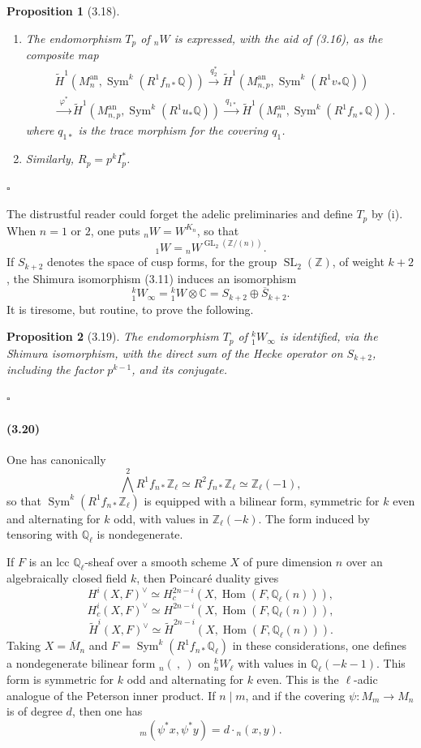 \documentclass[10pt]{article}
\newcommand{\C}{\mathbb C}
\newcommand{\Q}{\mathbb Q}
\newcommand{\Z}{\mathbb Z}
\newcommand{\GL}{\operatorname{GL}}
\newcommand{\SL}{\operatorname{SL}}
\newcommand{\Hom}{\operatorname{Hom}}
\newcommand{\Sym}{\operatorname{Sym}}
\newcommand{\an}{\mathrm{an}}
\newcommand{\QED}{\hfill$\square$}
\newtheorem*{proposition}{Proposition}
\begin{document}
\begin{proposition}[3.18]
\leavevmode
\begin{enumerate}[label=(\roman*)]
\item The endomorphism $T_p$ of ${}_nW$ is expressed, with the aid of (3.16), as the composite map
\[
\begin{aligned}
&\widetilde H^1(M_n^{\an},\Sym^k(R^1f_{n*}\Q))
\xrightarrow{\ q_2^*\ }
\widetilde H^1(M_{n,p}^{\an},\Sym^k(R^1v_*\Q))\\
&\xrightarrow{\ \varphi^*\ }
\widetilde H^1(M_{n,p}^{\an},\Sym^k(R^1u_*\Q))
\xrightarrow{\ q_{1*}\ }
\widetilde H^1(M_n^{\an},\Sym^k(R^1f_{n*}\Q)).
\end{aligned}
\]
where $q_{1*}$ is the trace morphism for the covering $q_1$.
\item Similarly, $R_p=p^k I_p^*$.
\end{enumerate}
\end{proposition}
\QED

The distrustful reader could forget the adelic preliminaries and define $T_p$ by (i). When $n=1$ or $2$, one puts ${}_nW=W^{K_n}$, so that
\[
{}_1W={}_nW^{\GL_2(\Z/(n))}.
\]
If $S_{k+2}$ denotes the space of cusp forms, for the group $\SL_2(\Z)$, of weight $k+2$, the Shimura isomorphism (3.11) induces an isomorphism
\[
{}^k_1W_\infty={}^k_1W\otimes\C=S_{k+2}\oplus \overline{S}_{k+2}.
\]
It is tiresome, but routine, to prove the following.

\begin{proposition}[3.19]
The endomorphism $T_p$ of ${}^k_1W_\infty$ is identified, via the Shimura isomorphism, with the direct sum of the Hecke operator on $S_{k+2}$, including the factor $p^{k-1}$, and its conjugate.
\end{proposition}
\QED

\paragraph{(3.20)}
One has canonically
\[
\bigwedge^2 R^1f_{n*}\Z_\ell\simeq R^2f_{n*}\Z_\ell\simeq \Z_\ell(-1),
\]
so that $\Sym^k(R^1f_{n*}\Z_\ell)$ is equipped with a bilinear form, symmetric for $k$ even and alternating for $k$ odd, with values in $\Z_\ell(-k)$. The form induced by tensoring with $\Q_\ell$ is nondegenerate.

If $F$ is an lcc $\Q_\ell$-sheaf over a smooth scheme $X$ of pure dimension $n$ over an algebraically closed field $k$, then Poincaré duality gives
\[
H^i(X,F)^\vee\simeq H_c^{2n-i}(X,\Hom(F,\Q_\ell(n))),
\]
\[
H_c^i(X,F)^\vee\simeq H^{2n-i}(X,\Hom(F,\Q_\ell(n))),
\]
\[
\widetilde H^i(X,F)^\vee\simeq \widetilde H^{2n-i}(X,\Hom(F,\Q_\ell(n))).
\]
Taking $X=\overline M_n$ and $F=\Sym^k(R^1f_{n*}\Q_\ell)$ in these considerations, one defines a nondegenerate bilinear form ${}_n(\ ,\ )$ on ${}^k_nW_\ell$ with values in $\Q_\ell(-k-1)$. This form is symmetric for $k$ odd and alternating for $k$ even. This is the $\ell$-adic analogue of the Peterson inner product. If $n\mid m$, and if the covering $\psi:M_m\to M_n$ is of degree $d$, then one has
\[
{}_m(\psi^*x,\psi^*y)=d\cdot {}_n(x,y).
\]
\end{document}
